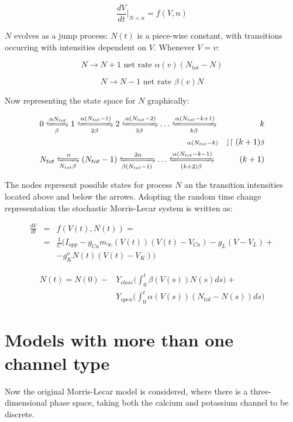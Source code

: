 $$\frac{dV}{dt}|_{N=n} = f(V, n)$$

$N$ evolves as a jump process: $N(t)$ is a piece-wise constant, with transitions occurring with intensities dependent on $V$.
Whenever $V = v$:

$$N\rightarrow N + 1\text{ net rate } \alpha(v)(N_{tot}-N)$$

$$N\rightarrow N - 1\text{ net rate } \beta(v)N$$

Now representing the state space for $N$ graphically:

\begin{align*}
&0\xleftrightharpoons[\beta]{\alpha N_{tot}} 1 \xleftrightharpoons[2\beta]{\alpha(N_{tot}-1)}2\xleftrightharpoons[3\beta]{\alpha(N_{tot}-2)} \dots \xleftrightharpoons[k\beta]{\alpha(N_{tot}-k+1)}&k\\
& \qquad\qquad\qquad\qquad\qquad\qquad\qquad\qquad\qquad\scriptstyle{\alpha(N_{tot}-k)}&\downharpoonleft\upharpoonright(k+1)\scriptstyle{\beta}\\
& N_{tot}\xleftrightharpoons[N_{tot}\beta]{\alpha}(N_{tot}-1)\xleftrightharpoons[\beta(N_{tot}-1)]{2\alpha}\dots\xleftrightharpoons[(k+2)\beta]{\alpha(N_{tot}-k-1)}&(k+1)
\end{align*}

The nodes represent possible states for process $N$ an the transition intensities located above and below the arrows.
Adopting the random time change representation the stochastic Morris-Lecar system is written as:

\begin{align*}
	\frac{dV}{dt} &=& f(V(t), N(t)) = \\
								&=& \frac{1}{C}(I_{app}-g_{Ca}m_\infty(V(t))(V(t)-V_{Ca})-g_L(V-V_L) +\\
								& & - g_K^oN(t)(V(t)-V_K))
\end{align*}

\begin{align*}
	N(t) = N(0) -&Y_{close}\biggl(\int_0^t\beta(V(s))N(s)ds\biggr) + \\
							 &Y_{open}\biggl(\int_0^t\alpha(V(s))(N_{tot}-N(s))ds\biggr)
\end{align*}

\section{Models with more than one channel type}
Now the original Morris-Lecar model is considered, where there is a three-dimensional phase space, taking both the calcium and potassium channel to be discrete.

